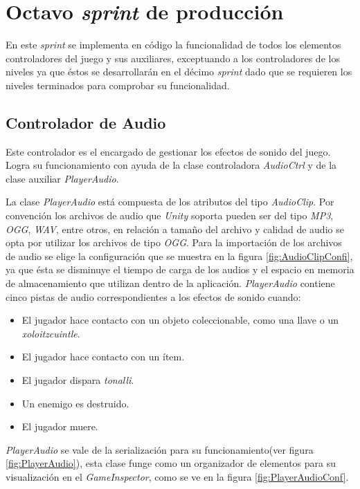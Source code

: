 \section{Octavo \textit{sprint} de producción}
En este \textit{sprint} se implementa en código la funcionalidad de todos los 
elementos controladores del juego y sus auxiliares, exceptuando a los 
controladores de los niveles ya que éstos se desarrollarán en el décimo 
\textit{sprint} dado que se requieren los niveles terminados para comprobar su 
funcionalidad.

\subsection{Controlador de Audio}
Este controlador es el encargado de gestionar los efectos de sonido del 
juego. Logra su funcionamiento con ayuda de la clase controladora 
\textit{AudioCtrl} y de la clase auxiliar \textit{PlayerAudio}. 
\\
\par
La clase \textit{PlayerAudio} está compuesta de los atributos del tipo 
\textit{AudioClip}. Por convención los archivos de audio que \textit{Unity} 
soporta pueden ser del tipo \textit{MP3}, \textit{OGG}, \textit{WAV}, entre 
otros, en relación a tamaño del archivo y calidad de audio se opta por utilizar 
los archivos de tipo \textit{OGG}. Para la importación de los archivos de audio 
se elige la configuración que se muestra en la figura \ref{fig:AudioClipConfi}, 
ya que ésta se disminuye el tiempo de carga de los audios y el espacio en 
memoria de almacenamiento que utilizan dentro de la aplicación. 
\textit{PlayerAudio} contiene cinco pistas de audio correspondientes a los 
efectos de sonido cuando: 
	\begin{itemize}
		\item El jugador hace contacto con un objeto coleccionable, como una 
		llave o un \textit{xoloitzcuintle}.
		\item El jugador hace contacto con un ítem.
		\item El jugador dispara \textit{tonalli}.
		\item Un enemigo es destruido.
		\item El jugador muere.
	\end{itemize}	 

\textit{PlayerAudio} se vale de la serialización para su funcionamiento(ver 
figura \ref{fig:PlayerAudio}), esta clase funge como un organizador de elementos 
para su visualización en el \textit{GameInspector}, como se ve en la figura 
\ref{fig:PlayerAudioConf}.   

